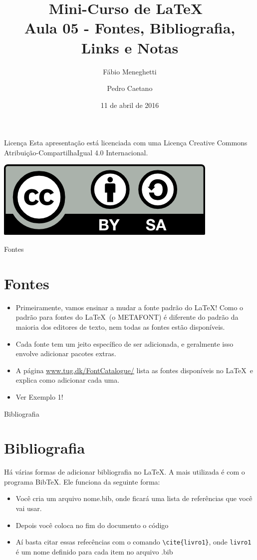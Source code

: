 \documentclass[12pt]{beamer}
\title{Mini-Curso de \LaTeX\ \\ Aula 05 - Fontes, Bibliografia, Links e Notas}
\author{Fábio Meneghetti \and Pedro Caetano}
\date{11 de abril de 2016}
\begin{document}
\begin{frame}
  \titlepage
\end{frame}

\begin{frame}{Licença}
  Esta apresentação está licenciada com uma Licença Creative Commons Atribuição-CompartilhaIgual 4.0 Internacional.
  \begin{center}
    \includegraphics[scale=0.3]{../license.png}
  \end{center}
\end{frame}

\begin{frame}
  \tableofcontents
\end{frame}

\begin{frame}{Fontes}
  \section{Fontes}
  \begin{itemize}
    \item Primeiramente, vamos ensinar a mudar a fonte padrão do \LaTeX! Como o padrão para fontes do \LaTeX\ (o METAFONT) é diferente do padrão da maioria dos editores de texto, nem todas as fontes estão disponíveis.
    \item Cada fonte tem um jeito específico de ser adicionada, e geralmente isso envolve adicionar pacotes extras.
    \item A página \url{www.tug.dk/FontCatalogue/} lista as fontes disponíveis no \LaTeX\ e explica como adicionar cada uma.
    \item Ver Exemplo 1!
  \end{itemize}
\end{frame}

\begin{frame}[fragile]{Bibliografia}
  \section{Bibliografia}
  Há várias formas de adicionar bibliografia no \LaTeX. A mais utilizada é com o programa BibTeX. Ele funciona da seguinte forma:
  \begin{itemize}
    \item Você cria um arquivo nome.bib, onde ficará uma lista de referências que você vai usar.
    \item Depois você coloca no fim do documento o código \verb++
    \item Aí basta citar essas refecências com o comando \verb+\cite{livro1}+, onde \verb+livro1+ é um nome definido para cada item no arquivo .bib
  \end{itemize}
\end{frame}
\end{document}
